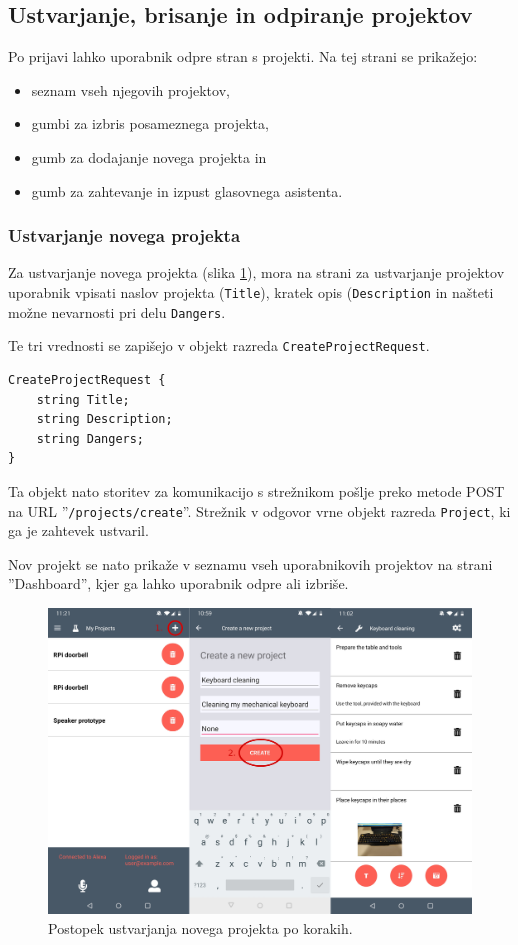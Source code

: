 \documentclass[a4paper, 12pt]{book}
\begin{document}
\subsection{Ustvarjanje, brisanje in odpiranje projektov}

Po prijavi lahko uporabnik odpre stran s projekti.
Na tej strani se prikažejo:
\begin{itemize}
	\item seznam vseh njegovih projektov, 
	\item gumbi za izbris posameznega projekta,
	\item gumb za dodajanje novega projekta in
	\item gumb za zahtevanje in izpust glasovnega asistenta.
\end{itemize}

\subsubsection{Ustvarjanje novega projekta}

Za ustvarjanje novega projekta (slika \ref{app_newproject}), mora na strani za ustvarjanje projektov uporabnik vpisati naslov projekta (\texttt{Title}), kratek opis (\texttt{Description} in našteti možne nevarnosti pri delu \texttt{Dangers}.

Te tri vrednosti se zapišejo v objekt razreda \texttt{CreateProjectRequest}.
\begin{Verbatim}[commandchars=+\[\]]
CreateProjectRequest {
    string Title;
    string Description;
    string Dangers;
}
\end{Verbatim}

Ta objekt nato storitev za komunikacijo s strežnikom pošlje preko metode POST na URL ''\texttt{/projects/create}''.
Strežnik v odgovor vrne objekt razreda \texttt{Project}, ki ga je zahtevek ustvaril.

Nov projekt se nato prikaže v seznamu vseh uporabnikovih projektov na strani ''Dashboard'', kjer ga lahko uporabnik odpre ali izbriše.

\begin{figure}[H]
\begin{center}
\includegraphics[width=13cm]{app_newproject}
\end{center}
	\caption{Postopek ustvarjanja novega projekta po korakih.}
\label{app_newproject}
\end{figure}
\end{document}
